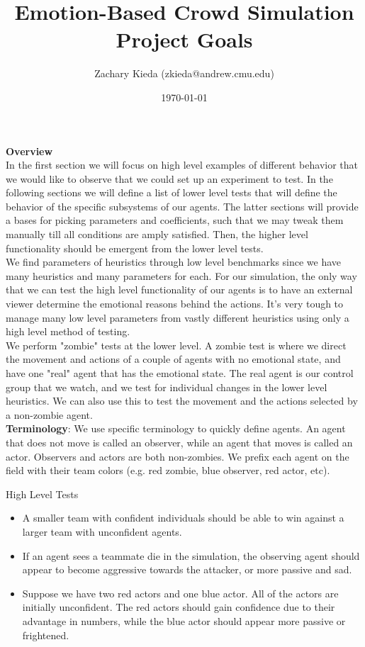 \documentclass[11pt]{article}
\begin{document}
\title{{Emotion-Based Crowd Simulation}\\
{Project Goals}}
\author{Zachary Kieda (zkieda@andrew.cmu.edu)}
\date{\today}
\maketitle

\textbf{Overview}\\
In the first section we will focus on high level examples of different behavior that we would like to observe that we could set up an experiment to test. In the following sections we will define a list of lower level tests that will define the behavior of the specific subsystems of our agents. The latter sections will provide a bases for picking parameters and coefficients, such that we may tweak them manually till all conditions are amply satisfied. Then, the higher level functionality should be emergent from the lower level tests.\\

We find parameters of heuristics through low level benchmarks since we have many heuristics and many parameters for each. For our simulation, the only way that we can test the high level functionality of our agents is to have an external viewer determine the emotional reasons behind the actions. It's very tough to manage many low level parameters from vastly different heuristics using only a high level method of testing.\\

We perform "zombie" tests at the lower level. A zombie test is where we direct the movement and actions of a couple of agents with no emotional state, and have one "real" agent that has the emotional state. The real agent is our control group that we watch, and we test for individual changes in the lower level heuristics. We can also use this to test the movement and the actions selected by a non-zombie agent.\\

\textbf{Terminology}: We use specific terminology to quickly define agents. An agent that does not move is called an observer, while an agent that moves is called an actor. Observers and actors are both non-zombies. We prefix each agent on the field with their team colors (e.g. red zombie, blue observer, red actor, etc).

\begin{section}{High Level Tests}
\begin{itemize}
\item A smaller team with confident individuals should be able to win against a larger team with unconfident agents.
\item If an agent sees a teammate die in the simulation, the observing agent should appear to become aggressive towards the attacker, or more passive and sad.
\item Suppose we have two red actors and one blue actor. All of the actors are initially unconfident. The red actors should gain confidence due to their advantage in numbers, while the blue actor should appear more passive or frightened.
\end{itemize}
\end{section}
\end{document}
